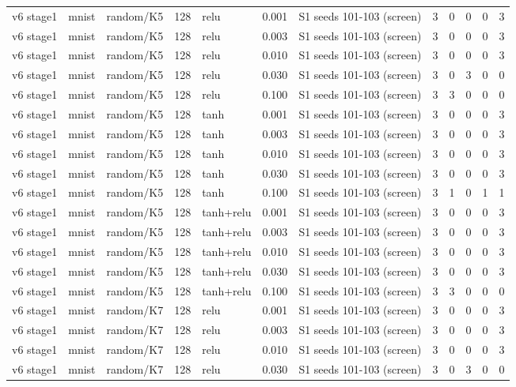 \begin{table}[htbp]
{\begin{tabular}{@{}lllrlrlrrrrr@{}}
v6 stage1 & mnist & random/K5 & 128 & relu & 0.001 & S1 seeds 101-103 (screen) & 3 & 0 & 0 & 0 & 3 \\
v6 stage1 & mnist & random/K5 & 128 & relu & 0.003 & S1 seeds 101-103 (screen) & 3 & 0 & 0 & 0 & 3 \\
v6 stage1 & mnist & random/K5 & 128 & relu & 0.010 & S1 seeds 101-103 (screen) & 3 & 0 & 0 & 0 & 3 \\
v6 stage1 & mnist & random/K5 & 128 & relu & 0.030 & S1 seeds 101-103 (screen) & 3 & 0 & 3 & 0 & 0 \\
v6 stage1 & mnist & random/K5 & 128 & relu & 0.100 & S1 seeds 101-103 (screen) & 3 & 3 & 0 & 0 & 0 \\
v6 stage1 & mnist & random/K5 & 128 & tanh & 0.001 & S1 seeds 101-103 (screen) & 3 & 0 & 0 & 0 & 3 \\
v6 stage1 & mnist & random/K5 & 128 & tanh & 0.003 & S1 seeds 101-103 (screen) & 3 & 0 & 0 & 0 & 3 \\
v6 stage1 & mnist & random/K5 & 128 & tanh & 0.010 & S1 seeds 101-103 (screen) & 3 & 0 & 0 & 0 & 3 \\
v6 stage1 & mnist & random/K5 & 128 & tanh & 0.030 & S1 seeds 101-103 (screen) & 3 & 0 & 0 & 0 & 3 \\
v6 stage1 & mnist & random/K5 & 128 & tanh & 0.100 & S1 seeds 101-103 (screen) & 3 & 1 & 0 & 1 & 1 \\
v6 stage1 & mnist & random/K5 & 128 & tanh+relu & 0.001 & S1 seeds 101-103 (screen) & 3 & 0 & 0 & 0 & 3 \\
v6 stage1 & mnist & random/K5 & 128 & tanh+relu & 0.003 & S1 seeds 101-103 (screen) & 3 & 0 & 0 & 0 & 3 \\
v6 stage1 & mnist & random/K5 & 128 & tanh+relu & 0.010 & S1 seeds 101-103 (screen) & 3 & 0 & 0 & 0 & 3 \\
v6 stage1 & mnist & random/K5 & 128 & tanh+relu & 0.030 & S1 seeds 101-103 (screen) & 3 & 0 & 0 & 0 & 3 \\
v6 stage1 & mnist & random/K5 & 128 & tanh+relu & 0.100 & S1 seeds 101-103 (screen) & 3 & 3 & 0 & 0 & 0 \\
v6 stage1 & mnist & random/K7 & 128 & relu & 0.001 & S1 seeds 101-103 (screen) & 3 & 0 & 0 & 0 & 3 \\
v6 stage1 & mnist & random/K7 & 128 & relu & 0.003 & S1 seeds 101-103 (screen) & 3 & 0 & 0 & 0 & 3 \\
v6 stage1 & mnist & random/K7 & 128 & relu & 0.010 & S1 seeds 101-103 (screen) & 3 & 0 & 0 & 0 & 3 \\
v6 stage1 & mnist & random/K7 & 128 & relu & 0.030 & S1 seeds 101-103 (screen) & 3 & 0 & 3 & 0 & 0 \\

\end{tabular}}
\end{table}
